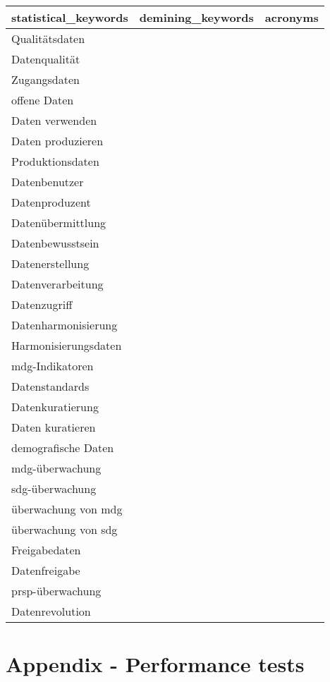\documentclass[
]{article}
\begin{document}
\begin{table}[H]
\centering\begingroup\fontsize{10}{12}\selectfont

\begin{tabular}{l|l|l}
\hline
statistical\_keywords & demining\_keywords & acronyms\\
\hline
Qualitätsdaten &  & \\
\hline
Datenqualität &  & \\
\hline
Zugangsdaten &  & \\
\hline
offene Daten &  & \\
\hline
Daten verwenden &  & \\
\hline
Daten produzieren &  & \\
\hline
Produktionsdaten &  & \\
\hline
Datenbenutzer &  & \\
\hline
Datenproduzent &  & \\
\hline
Datenübermittlung &  & \\
\hline
Datenbewusstsein &  & \\
\hline
Datenerstellung &  & \\
\hline
Datenverarbeitung &  & \\
\hline
Datenzugriff &  & \\
\hline
Datenharmonisierung &  & \\
\hline
Harmonisierungsdaten &  & \\
\hline
mdg-Indikatoren &  & \\
\hline
Datenstandards &  & \\
\hline
Datenkuratierung &  & \\
\hline
Daten kuratieren &  & \\
\hline
demografische Daten &  & \\
\hline
mdg-überwachung &  & \\
\hline
sdg-überwachung &  & \\
\hline
überwachung von mdg &  & \\
\hline
überwachung von sdg &  & \\
\hline
Freigabedaten &  & \\
\hline
Datenfreigabe &  & \\
\hline
prsp-überwachung &  & \\
\hline
Datenrevolution &  & \\
\hline
\end{tabular}
\endgroup{}
\end{table}

\hypertarget{Appendix-B}{%
\section{Appendix - Performance tests}\label{Appendix-B}}
\end{document}
